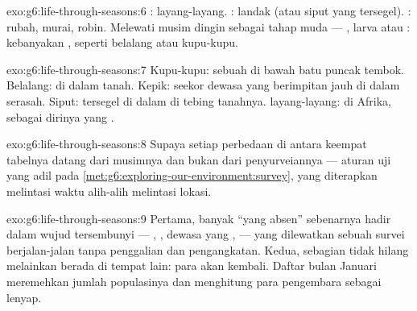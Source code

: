 \begin{solution}{exo:g6:life-through-seasons:6}
:  layang-layang. : landak (atau siput
yang tersegel). : rubah,  murai,  robin.
Melewati musim dingin sebagai tahap muda --- , larva atau
: kebanyakan , seperti belalang atau kupu-kupu.
\end{solution}

\begin{solution}{exo:g6:life-through-seasons:7}
Kupu-kupu: sebuah  di bawah batu puncak tembok. Belalang:
 di dalam tanah. Kepik: seekor dewasa yang  berimpitan jauh
di dalam serasah. Siput: tersegel di dalam  di tebing
tanahnya.  layang-layang: di Afrika, sebagai dirinya yang
.
\end{solution}

\begin{solution}{exo:g6:life-through-seasons:8}
Supaya setiap perbedaan di antara keempat tabelnya datang dari
musimnya dan bukan dari penyurveiannya --- aturan uji yang adil pada
\cref{met:g6:exploring-our-environment:survey}, yang diterapkan
melintasi waktu alih-alih melintasi lokasi.
\end{solution}

\begin{solution}{exo:g6:life-through-seasons:9}
Pertama, banyak ``yang absen'' sebenarnya hadir dalam wujud tersembunyi
--- , , dewasa yang ,  --- yang
dilewatkan sebuah survei berjalan-jalan tanpa penggalian dan
pengangkatan. Kedua, sebagian tidak hilang melainkan berada di tempat
lain: para  akan kembali. Daftar bulan Januari meremehkan
jumlah populasinya dan menghitung para pengembara sebagai lenyap.
\end{solution}

